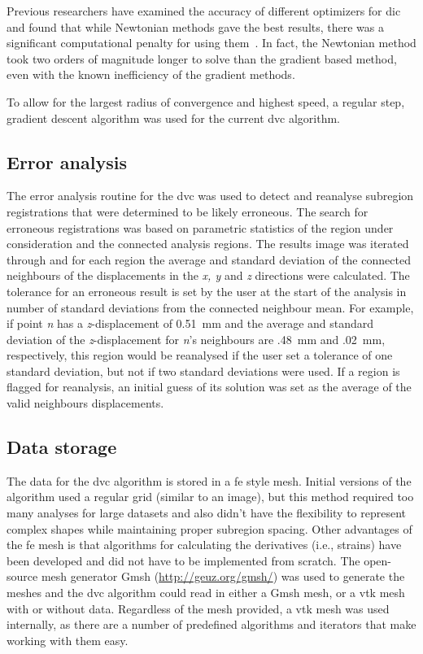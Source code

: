 Previous researchers have examined the accuracy of different optimizers for \ac{dic} and found that while Newtonian methods gave the best results, there was a significant computational penalty for using them~\citep{bing_performance_2006}.
In fact, the Newtonian method took two orders of magnitude longer to solve than the gradient based method, even with the known inefficiency of the gradient methods.

To allow for the largest radius of convergence and highest speed, a regular step, gradient descent algorithm was used for the current \ac{dvc} algorithm.

\subsection{Error analysis}
\label{sec:dvc_implement_error}
The error analysis routine for the \ac{dvc} was used to detect and reanalyse subregion registrations that were determined to be likely erroneous.
The search for erroneous registrations was based on parametric statistics of the region under consideration and the connected analysis regions.
The results image was iterated through and for each region the average and standard deviation of the connected neighbours of the displacements in the \textit{x, y} and \textit{z} directions were calculated.
The tolerance for an erroneous result is set by the user at the start of the analysis in number of standard deviations from the connected neighbour mean.
For example, if point \textit{n} has a \textit{z}-displacement of 0.51~mm and the average and standard deviation of the \textit{z}-displacement for \textit{n}'s neighbours are .48~mm and .02~mm, respectively, this region would be reanalysed if the user set a tolerance of one standard deviation, but not if two standard deviations were used.
If a region is flagged for reanalysis, an initial guess of its solution was set as the average of the valid neighbours displacements.

\subsection{Data storage}
\label{sec:dvc_implementation_storage}
The data for the \ac{dvc} algorithm is stored in a \acl{fe} style mesh.
Initial versions of the algorithm used a regular grid (similar to an image), but this method required too many analyses for large datasets and also didn't have the flexibility to represent complex shapes while maintaining proper subregion spacing.
Other advantages of the \ac{fe} mesh is that algorithms for calculating the derivatives (i.e., strains) have been developed and did not have to be implemented from scratch.
The open-source mesh generator Gmsh (\url{http://geuz.org/gmsh/}) was used to generate the meshes and the \ac{dvc} algorithm could read in either a Gmsh mesh, or a \ac{vtk} mesh with or without data.
Regardless of the mesh provided, a \ac{vtk} mesh was used internally, as there are a number of predefined algorithms and iterators that make working with them easy.

